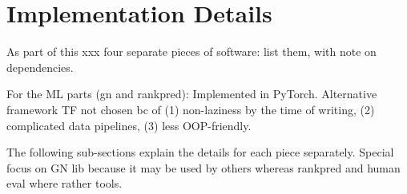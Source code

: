 \section{Implementation Details}

As part of this xxx four separate pieces of software: list them, with note on dependencies.

For the ML parts (gn and rankpred): Implemented in PyTorch. Alternative framework TF not chosen bc of (1) non-laziness by the time of writing, (2) complicated data pipelines, (3) less OOP-friendly.

The following sub-sections explain the details for each piece separately. Special focus on GN lib because it may be used by others whereas rankpred and human eval where rather tools.




